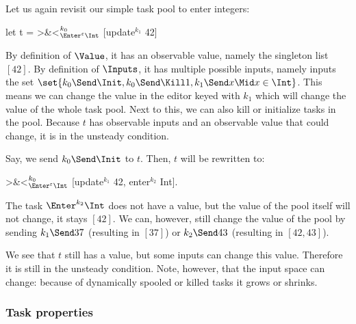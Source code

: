 \begin{example}
  \label{exm:integer-task-pool}
  Let us again revisit our simple task pool to enter integers:
  \begin{TASK}
    let t = >&<$_{\Enter^\epsilon \Int}^{k_0}$ [update$^{k_1}$ 42]
  \end{TASK}

  By definition of $\Value$, it has an observable value, namely the singleton list $[42]$.
  By definition of $\Inputs$, it has multiple possible inputs,
  namely inputs the set $\set{k_0\Send\Init, k_0\Send\Kill1, k_1\Send x \Mid x\in\Int}$.
  This means we can change the value in the editor keyed with $k_1$
  which will change the value of the whole task pool.
  Next to this, we can also kill or initialize tasks in the pool.
  Because $t$ has observable inputs and an observable value that could change,
  it is in the unsteady condition.

  Say, we send $k_0\Send\Init$ to $t$.
  Then, $t$ will be rewritten to:
  \begin{TASK}
    >&<$_{\Enter^\epsilon \Int}^{k_0}$ [update$^{k_1}$ 42, enter$^{k_2}$ Int].
  \end{TASK}
  The task $\Enter^{k_2}\Int$ does not have a value,
  but the value of the pool itself will not change,
  it stays $[42]$.
  We can, however, still change the value of the pool by sending
  $k_1\Send37$ (resulting in $[37]$) or $k_2\Send43$ (resulting in $[42,43]$).

  We see that $t$ still has a value,
  but some inputs can change this value.
  Therefore it is still in the unsteady condition.
  Note, however, that the input space can change:
  because of dynamically spooled or killed tasks it grows or shrinks.
\end{example}


\subsubsection{Task properties}
\label{sub:task-properties}

